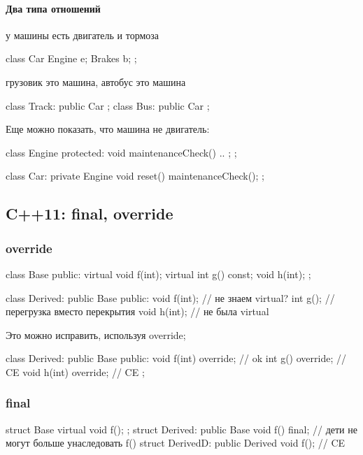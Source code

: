 \paragraph{Два типа отношений}
\begin{description}[noitemsep]
    \item[has a] у машины есть двигатель и тормоза
\begin{cppcode}
class Car {
    Engine e;
    Brakes b;
};
\end{cppcode}
    \item[is a] грузовик это  машина, автобус это машина 
\begin{cppcode}
class Track: public Car {};
class Bus: public Car {};
\end{cppcode}
\end{description}
Еще можно показать, что машина не двигатель:
\begin{cppcode}
class Engine {
    protected:
    void maintenanceCheck() { .. };
};

class Car: private Engine {
    void reset() {
	maintenanceCheck();
    }
};
\end{cppcode}

\subsection{C++11: final, override}
\subsubsection{override}
\begin{minipage}{0.45\textwidth}
\begin{cppcode}
class Base {
    public:
    virtual void f(int);
    virtual int g() const;
    void h(int);
};
\end{cppcode}
\begin{cppcode}
class Derived: public Base {
public:
    void f(int); // не знаем virtual?
    int g(); // перегрузка вместо перекрытия
    void h(int); // не была virtual
}
\end{cppcode}
\end{minipage}
\hfill
\begin{minipage}{0.45\textwidth}
    Это можно исправить, используя override;
\begin{ccode}
class Derived: public Base {
    public:
    void f(int) override; // ok
    int g() override; // CE
    void h(int) override; // CE
};
\end{ccode}
\end{minipage}
\subsubsection{final}
\begin{ccode}
struct Base {
    virtual void f();
};
struct Derived: public Base {
    void f() final; // дети не могут больше унаследовать f()
}
struct DerivedD: public Derived {
    void f(); // CE
}
\end{ccode}
